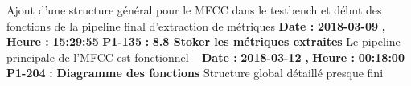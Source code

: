 \documentclass{article}%
\begin{document}
\newline%
\newline%
%
Ajout d'une structure général pour le MFCC dans le testbench et début des fonctions de la pipeline final d'extraction de métriques\newline%
\newline%
%
\textbf{Date : }%
\textbf{2018{-}03{-}09}%
\textbf{,}%
\textbf{ Heure : }%
\textbf{15:29:55}%
\newline%
%
\textbf{P1{-}135 }%
\textbf{ : }%
\textbf{ 8.8 Stoker les métriques extraites}%
\newline%
\newline%
%
Le pipeline principale de l'MFCC est fonctionnel\newline%
~\newline%
\newline%
%
\textbf{Date : }%
\textbf{2018{-}03{-}12}%
\textbf{,}%
\textbf{ Heure : }%
\textbf{00:18:00}%
\newline%
%
\textbf{P1{-}204 }%
\textbf{ : }%
\textbf{ Diagramme des fonctions}%
\newline%
\newline%
%
Structure global détaillé presque fini\newline%
~\newline%
\newline%
%
\newpage

%
\end{document}
